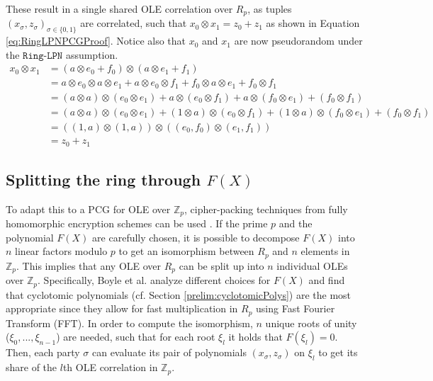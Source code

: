 These result in a single shared OLE correlation over $R_p$, as tuples $(x_\sigma, z_\sigma)_{\sigma\in\{0,1\}}$ are correlated, such that $x_0\otimes x_1 = z_0 + z_1$ as shown in Equation \ref{eq:RingLPNPCGProof}. Notice also that $x_0$ and $x_1$ are now pseudorandom under the $\texttt{Ring-LPN}$ assumption.
\begin{equation}
\begin{aligned}
x_0 \otimes x_1 &= (a \otimes e_0 + f_0) \otimes (a \otimes e_1 + f_1) \\
    &= a \otimes e_0  \otimes a \otimes e_1 + a \otimes e_0 \otimes f_1 + f_0 \otimes a \otimes e_1 + f_0 \otimes f_1 \\
    &= (a \otimes a) \otimes (e_0 \otimes e_1) + a \otimes (e_0 \otimes f_1)  + a \otimes (f_0 \otimes e_1)  + (f_0 \otimes f_1) \\
    &= (a \otimes a) \otimes (e_0 \otimes e_1) + (1 \otimes a) \otimes (e_0 \otimes f_1)  + (1 \otimes a) \otimes (f_0 \otimes e_1)  + (f_0 \otimes f_1) \\
    &= ((1,a) \otimes (1,a)) \otimes ((e_0, f_0) \otimes (e_1, f_1)) \\
    &= z_0 + z_1
\label{eq:RingLPNPCGProof}
\end{aligned}
\end{equation}

\subsection{Splitting the ring through $F(X)$}
\label{subseq:realtiontofx}
To adapt this to a PCG for OLE over $\mathbb{Z}_p$, cipher-packing techniques from fully homomorphic encryption schemes can be used \cite{smart2014fully}. If the prime $p$ and the polynomial $F(X)$ are carefully chosen, it is possible to decompose $F(X)$ into $n$ linear factors modulo $p$ to get an isomorphism between $R_p$ and $n$ elements in $\mathbb{Z}_p$. This implies that any OLE over $R_p$ can be split up into $n$ individual OLEs over $\mathbb{Z}_p$. Specifically, Boyle et al. \cite{boyle2020efficient} analyze different choices for $F(X)$ and find that cyclotomic polynomials (cf. Section \ref{prelim:cyclotomicPolys}) are the most appropriate since they allow for fast multiplication in $R_p$ using Fast Fourier Transform (FFT). In order to compute the isomorphism, $n$ unique roots of unity ($\xi_0, ...,\xi_{n-1}$) are needed, such that for each root $\xi_l$ it holds that $F(\xi_l)=0$. Then, each party $\sigma$ can evaluate its pair of polynomials $(x_\sigma, z_\sigma)$ on $\xi_l$ to get its share of the $l$th OLE correlation in $\mathbb{Z}_p$.

